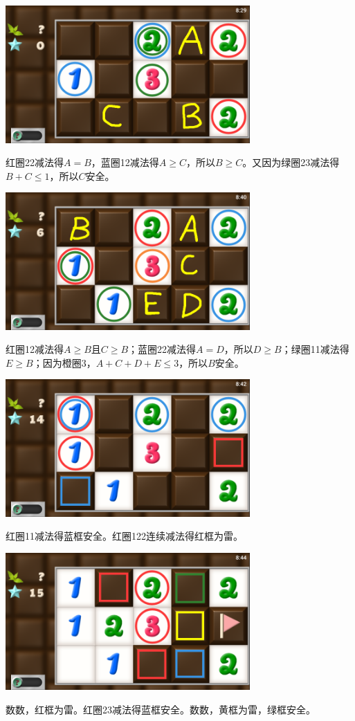 \subsection{} %
\begin{center}
    \includegraphics[width=0.7\textwidth]{puzzle/110-1.png}
\end{center}
红圈22减法得$A=B$，蓝圈12减法得$A\ge C$，所以$B\ge C$。又因为绿圈23减法得$B+C\le 1$，所以$C$安全。
\begin{center}
    \includegraphics[width=0.7\textwidth]{puzzle/110-2.png}
\end{center}
红圈12减法得$A\ge B$且$C\ge B$；蓝圈22减法得$A=D$，所以$D\ge B$；绿圈11减法得$E\ge B$；因为橙圈3，$A+C+D+E\le 3$，所以$B$安全。
\begin{center}
    \includegraphics[width=0.7\textwidth]{puzzle/110-3.png}
\end{center}
红圈11减法得蓝框安全。红圈122连续减法得红框为雷。
\begin{center}
    \includegraphics[width=0.7\textwidth]{puzzle/110-4.png}
\end{center}
数数，红框为雷。红圈23减法得蓝框安全。数数，黄框为雷，绿框安全。

